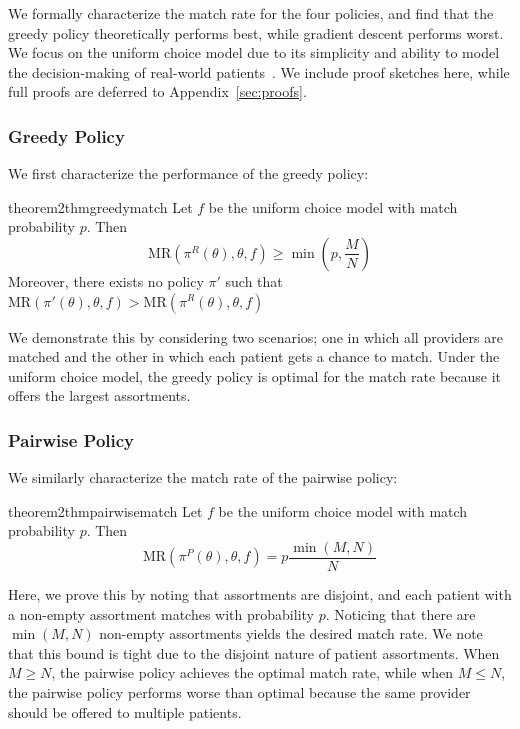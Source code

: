 \documentclass[11pt]{article}
\begin{document}
We formally characterize the match rate for the four policies, and find that the greedy policy theoretically performs best, while gradient descent performs worst. 
We focus on the uniform choice model due to its simplicity and ability to model the decision-making of real-world patients~\citep{choosing_doctor}. 
We include proof sketches here, while full proofs are deferred to Appendix~\ref{sec:proofs}. 

\subsubsection{Greedy Policy}
We first characterize the performance of the greedy policy: 

\begin{restatable}{theorem2}{thmgreedymatch}
\label{thm:greedy_match}
    Let $f$ be the uniform choice model with match probability $p$. 
    Then 
    \begin{equation}
        \mathrm{MR}(\pi^{R}(\theta),\theta,f)  \geq \min(p,\frac{M}{N})
    \end{equation}
    Moreover, there exists no policy $\pi'$ such that $\mathrm{MR}(\pi'(\theta),\theta,f) > \mathrm{MR}(\pi^{R}(\theta),\theta,f)$
\end{restatable}

We demonstrate this by considering two scenarios; one in which all providers are matched and the other in which each patient gets a chance to match. 
Under the uniform choice model, the greedy policy is optimal for the match rate because it offers the largest assortments.   

\subsubsection{Pairwise Policy}
We similarly characterize the match rate of the pairwise policy: 

\begin{restatable}{theorem2}{thmpairwisematch}
\label{thm:pairwise_match}
     Let $f$ be the uniform choice model with match probability $p$. 
    Then 
    \begin{equation}
        \mathrm{MR}(\pi^{P}(\theta),\theta,f)  = p \frac{\min(M,N)}{N}
    \end{equation}
\end{restatable}
Here, we prove this by noting that assortments are disjoint, and each patient with a non-empty assortment matches with probability $p$. 
Noticing that there are $\min(M,N)$ non-empty assortments yields the desired match rate. 
We note that this bound is tight due to the disjoint nature of patient assortments. 
When $M \geq N$, the pairwise policy achieves the optimal match rate, while when $M \leq N$, the pairwise policy performs worse than optimal because the same provider should be offered to multiple patients. 
\end{document}
